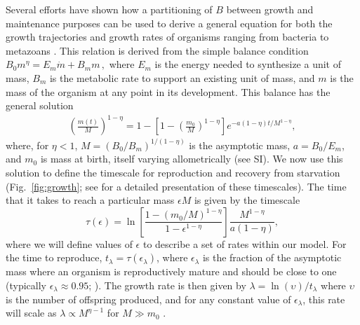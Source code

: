 \documentclass{pnastwo}
\begin{document}
\begin{article}
Several efforts have shown how a partitioning of $B$ between growth and
maintenance purposes can be used to derive a general equation for both the
growth trajectories and growth rates of organisms ranging from bacteria to
metazoans
\cite{West:2001bv,moses2008rmo,gillooly2002esa,hou,Kempes:2012hy}. This relation is derived from the simple balance condition 
$B_{0}m^{\eta}=E_{m}\dot{m}+B_{m}m\,,$
\cite{West:2001bv,moses2008rmo,gillooly2002esa,hou,Kempes:2012hy} where $E_{m}$ is the energy needed to synthesize a unit of mass, $B_{m}$ is
the metabolic rate to support an existing unit of mass, and $m$ is the mass
of the organism at any point in its development.  This balance has the
general solution \cite{bettencourt,Kempes:2012hy}
\begin{eqnarray}
\label{m1}
\left(\frac{m\left(t\right)}{M}\right)^{1-\eta}\!=1\!-\!\left[1\!-\!\left(\frac{m_{0}}{M}\right)^{1\!-\!\eta}\right]e^{-a\left(1\!-\!\eta\right)t/M^{1-\eta}},
\end{eqnarray}
where, for $\eta<1$, $M=(B_{0}/B_{m})^{1/(1-\eta)}$ is the asymptotic mass, $a=B_{0}/E_{m}$, and $m_0$ is mass at birth, itself varying allometrically (see SI).  We now use this solution to define the timescale for reproduction and recovery from starvation (Fig.~\ref{fig:growth}; see \cite{moses2008rmo} for a detailed presentation of these timescales). The time that it takes to reach a particular mass $\epsilon M$ is given by the timescale
\begin{equation}
\label{t1}
\tau\left(\epsilon\right) = \ln\left[\frac{1-\left(m_{0}/M\right)^{1-\eta}}{1-\epsilon^{1-\eta}}\right]\frac{M^{1-\eta}}{a\left(1-\eta\right)},
\end{equation}
where we will define values of $\epsilon$ to describe a set of rates within our model. For the time to reproduce, $t_{\lambda}=\tau\left(\epsilon_{\lambda}\right)$, where $\epsilon_{\lambda}$ is the fraction of the asymptotic mass where an organism is reproductively mature and should be close to one (typically $\epsilon_{\lambda}\approx0.95$; ). The growth rate is then given by $\lambda=\ln\left(\upsilon\right)/t_{\lambda}$ where $\upsilon$ is the number of offspring produced, and for any constant value of $\epsilon_{\lambda}$, this rate will scale as $\lambda\propto M^{\eta-1}$ for $M\gg m_{0}$ \cite{West:2001bv,moses2008rmo,gillooly2002esa,hou,Kempes:2012hy}.



\end{article}
\end{document}

